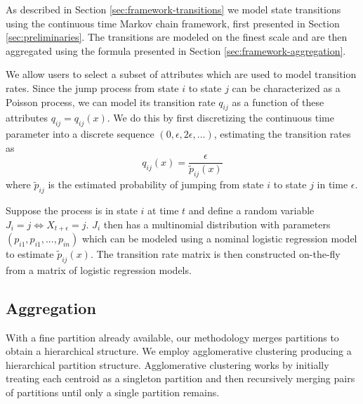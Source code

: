 As described in Section \ref{sec:framework-transitions} we model state transitions using the continuous
time Markov chain framework, first presented in Section \ref{sec:preliminaries}. The transitions are 
modeled on the finest scale and are then aggregated using the formula presented in Section \ref{sec:framework-aggregation}.

We allow users to select a subset of attributes which are used to model transition rates. Since the
jump process from state $i$ to state $j$ can be characterized as a Poisson process, we can model its
transition rate $q_{ij}$ as a function of these attributes $q_{ij} = q_{ij}(x)$. We do this by first
discretizing the continuous time parameter into a discrete sequence $(0, \epsilon, 2\epsilon, ...)$,
estimating the transition rates as
\begin{equation}
	q_{ij}(x) = \frac{\epsilon}{\tilde{p}_{ij}(x)}
\end{equation}
where $\tilde{p}_{ij}$ is the estimated probability of jumping from state $i$ to state $j$ in time
$\epsilon$.

Suppose the process is in state $i$ at time $t$ and define a random variable $J_i = j \Leftrightarrow X_{t + \epsilon} = j$.
$J_i$ then has a multinomial distribution with parameters $(p_{i1}, p_{i1}, ..., p_{in})$ which can be 
modeled using a nominal logistic regression model \cite{glm-introduction} to estimate $\tilde{p}_{ij}(x)$.
The transition rate matrix is then constructed on-the-fly from a matrix of logistic regression models.


\subsection{Aggregation}
\label{sec:state-aggregation-impl}

With a fine partition already available, our methodology merges partitions to obtain a hierarchical structure.
We employ agglomerative clustering \cite{Murtagh83} producing a hierarchical partition structure.
Agglomerative clustering works by initially treating each centroid as a singleton partition and then recursively
merging pairs of partitions until only a single partition remains.

